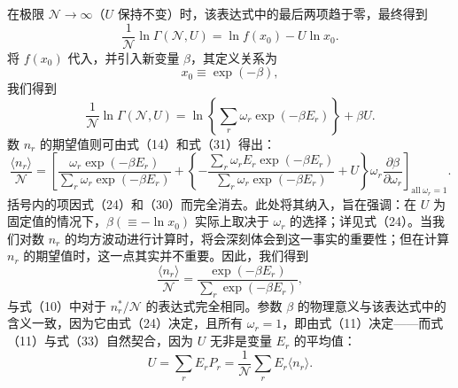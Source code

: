 在极限 \(\mathcal{N} \rightarrow \infty\)（\(U\) 保持不变）时，该表达式中的最后两项趋于零，最终得到
\begin{equation}\tag{3.2.29}\label{eq:3.2.29}
\frac { 1 } { \mathcal { N } } \ln \Gamma ( \mathcal { N } , U ) = \ln f ( x _ { 0 } ) - U \ln x _ { 0 } .
\end{equation}
将 \(f(x_0)\) 代入，并引入新变量 \(\beta\)，其定义关系为
\begin{equation}\tag{3.2.30}\label{eq:3.2.30}
x _ { 0 } \equiv \exp ( - \beta ) ,
\end{equation}
我们得到
\begin{equation}\tag{3.2.31}\label{eq:3.2.31}
\frac { 1 } { \mathcal { N } } \ln \Gamma ( \mathcal { N } , U ) = \ln \left\{ \sum _ { r } \omega _ { r } \exp ( - \beta E _ { r } ) \right\} + \beta U .
\end{equation}
数 \(n_{r}\) 的期望值则可由式（14）和式（31）得出：
\begin{equation}\tag{3.2.32}\label{eq:3.2.32}
\frac { \langle n _ { r } \rangle } { \mathcal { N } } = \left[ \frac { \omega _ { r } \exp ( - \beta E _ { r } ) } { \sum _ { r } \omega _ { r } \exp ( - \beta E _ { r } ) } + \left\{ - \frac { \sum _ { r } \omega _ { r } E _ { r } \exp ( - \beta E _ { r } ) } { \sum _ { r } \omega _ { r } \exp ( - \beta E _ { r } ) } + U \right\} \omega _ { r } \frac { \partial \beta } { \partial \omega _ { r } } \right] _ { \mathrm { a l l } \ \omega _ { r } = 1 } .
\end{equation}
括号内的项因式（24）和（30）而完全消去。此处将其纳入，旨在强调：在 \(U\) 为固定值的情况下，\(\beta(\equiv -\ln x_0)\) 实际上取决于 \(\omega_r\) 的选择；详见式（24）。当我们对数 \(n_r\) 的均方波动进行计算时，将会深刻体会到这一事实的重要性；但在计算 \(n_r\) 的期望值时，这一点其实并不重要。因此，我们得到
\begin{equation}\tag{3.2.33}\label{eq:3.2.33}
\frac { \langle n _ { r } \rangle } { \mathcal { N } } = \frac { \exp ( - \beta E _ { r } ) } { \sum _ { r } \exp ( - \beta E _ { r } ) } ,
\end{equation}
与式（10）中对于 \(n_{r}^{*}/\mathcal{N}\) 的表达式完全相同。参数 \(\beta\) 的物理意义与该表达式中的含义一致，因为它由式（24）决定，且所有 \(\omega_{r}=1\)，即由式（11）决定——而式（11）与式（33）自然契合，因为 \(U\) 无非是变量 \(E_{r}\) 的平均值：
\begin{equation}\tag{3.2.34}\label{eq:3.2.34}
U = \sum _ { r } E _ { r } P _ { r } = \frac { 1 } { \mathcal { N } } \sum _ { r } E _ { r } \langle n _ { r } \rangle .
\end{equation}
